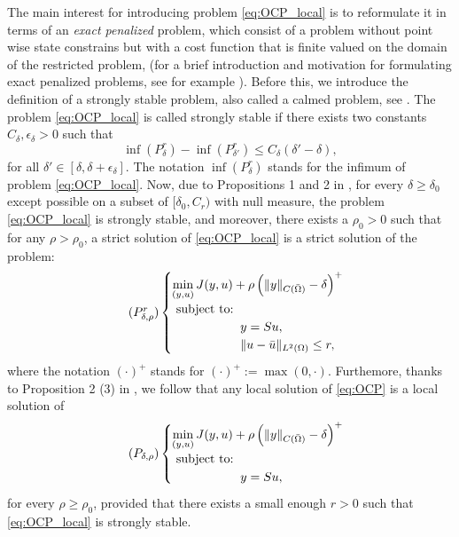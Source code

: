 \documentclass[11pt,a4paper]{amsart}
\renewcommand{\l}{\left}
\renewcommand{\r}{\right}
\newcommand{\om}{\Omega}
\newcommand{\norm}[1]{\lVert #1 \rVert}
\begin{document}
The main interest for introducing problem \eqref{eq:OCP_local} is to reformulate it in terms of an \textit{exact penalized} problem, which consist of a problem without point wise state constrains but with a cost function that is finite valued on the domain of the restricted problem, (for a brief introduction and motivation for formulating exact penalized problems, see for example \cite{burke}). Before this, we introduce the definition of a strongly stable problem, also called a calmed problem, see \cite{casas2009}.
The problem \eqref{eq:OCP_local} is called strongly stable if there exists two constants $C_\delta, \epsilon_\delta>0$ such that
\[
\inf (P^{r}_{\delta})-\inf (P^r_{\delta'})\le C_{\delta}(\delta'-\delta),
\]
for all $\delta'\in [\delta, \delta+\epsilon_\delta]$. The notation $\inf (P^{r}_{\delta})$ stands for the infimum of problem \eqref{eq:OCP_local}.
Now, due to Propositions 1 and 2 in \cite{casas2009}, for every $\delta\ge \delta_0$ except possible on a subset of $[\delta_0,C_r)$ with null measure, the problem \eqref{eq:OCP_local} is strongly stable, and moreover, there exists a $\rho_0>0$ such that for any $\rho>\rho_0$, a strict solution of \eqref{eq:OCP_local} is a strict solution of the problem:
\begin{equation}
		\tag{$P_{\delta,\rho}^r$} \label{eq:OCP_penalized_r}
		\begin{cases}
			\displaystyle\min_{(y,u)} J(y,u)+\rho\l(\norm{y}_{C(\bar\om)}-\delta\r)^+\\
			\hbox{ subject to: }\\
			\hspace{40pt}\begin{array}{rll}
				&y=Su,\\
                &\norm{u-\bar u}_{L^2(\om)}\le r,
			\end{array}			
		\end{cases}
\end{equation}
where the notation $\l(\cdot\r)^+$ stands for $(\cdot)^+:=\max(0,\cdot)$. Furthemore, thanks to Proposition 2 (3) in \cite{casas2009}, we follow that any local solution of \eqref{eq:OCP} is a local solution of
\begin{equation}
		\tag{$P_{\delta,\rho}$} \label{eq:OCP_penalized}
		\begin{cases}
			\displaystyle\min_{(y,u)} J(y,u)+\rho\l(\norm{y}_{C(\bar\om)}-\delta\r)^+\\
			\hbox{ subject to: }\\
			\hspace{40pt}\begin{array}{rll}
				&y=Su,              
			\end{array}			
		\end{cases}
\end{equation}
for every $\rho\ge \rho_0$, provided that there exists a small enough $r>0$ such that \eqref{eq:OCP_local} is strongly stable.
\end{document}
